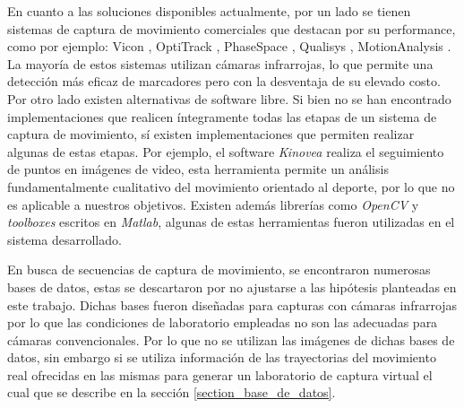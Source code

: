 \hspace*{0.5cm}En cuanto a las soluciones disponibles actualmente, por un lado se tienen sistemas de captura de movimiento comerciales que destacan por su performance, como por ejemplo: Vicon \cite{vicon},
OptiTrack \cite{optitrack}, PhaseSpace \cite{phasespace}, Qualisys \cite{qualisys}, MotionAnalysis \cite{motion_analysis}. La mayoría de estos sistemas utilizan cámaras infrarrojas, lo que permite una detección más eficaz de marcadores pero con la desventaja de su elevado costo. Por otro lado existen  alternativas de software libre. Si bien no se han encontrado implementaciones que realicen íntegramente todas las etapas de un sistema de captura de movimiento, sí existen implementaciones que permiten realizar algunas de estas etapas. Por ejemplo, el software \emph{Kinovea} \cite{kinovea} realiza el seguimiento de puntos en imágenes de video, esta herramienta permite un análisis fundamentalmente cualitativo del movimiento orientado al deporte, por lo que no es aplicable a nuestros objetivos. Existen además librerías como \textit{OpenCV} y \textit{toolboxes} escritos en \emph{Matlab}, algunas de estas herramientas fueron utilizadas en el sistema desarrollado. 




\hspace*{0.5cm}En busca de secuencias de captura de movimiento, se encontraron numerosas bases de datos, estas se descartaron por no ajustarse a las hipótesis planteadas en este trabajo. Dichas bases fueron diseñadas para capturas con cámaras infrarrojas por lo que las condiciones de laboratorio empleadas no son las adecuadas para cámaras convencionales. Por lo que no se utilizan las imágenes de dichas bases de datos, sin embargo si se utiliza información de las trayectorias del movimiento real ofrecidas en las mismas para generar un laboratorio de captura virtual el cual que se describe en  la sección \ref{section_base_de_datos}.

